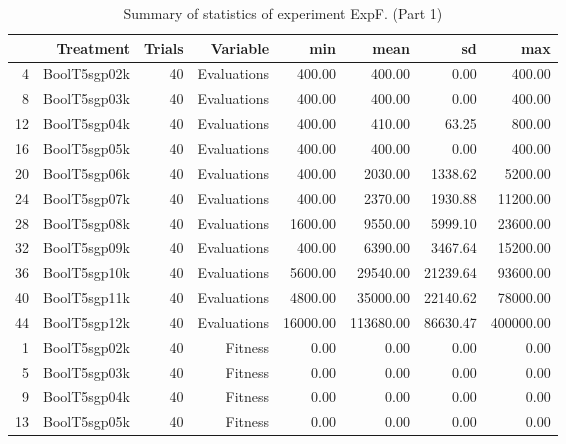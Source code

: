\begin{table}[ht]
\centering
\begin{tabular}{rrrrrrrr}
  \hline
 & Treatment & Trials & Variable & min & mean & sd & max \\ 
  \hline
4 & BoolT5sgp02k &  40 & Evaluations & 400.00 & 400.00 & 0.00 & 400.00 \\ 
  8 & BoolT5sgp03k &  40 & Evaluations & 400.00 & 400.00 & 0.00 & 400.00 \\ 
  12 & BoolT5sgp04k &  40 & Evaluations & 400.00 & 410.00 & 63.25 & 800.00 \\ 
  16 & BoolT5sgp05k &  40 & Evaluations & 400.00 & 400.00 & 0.00 & 400.00 \\ 
  20 & BoolT5sgp06k &  40 & Evaluations & 400.00 & 2030.00 & 1338.62 & 5200.00 \\ 
  24 & BoolT5sgp07k &  40 & Evaluations & 400.00 & 2370.00 & 1930.88 & 11200.00 \\ 
  28 & BoolT5sgp08k &  40 & Evaluations & 1600.00 & 9550.00 & 5999.10 & 23600.00 \\ 
  32 & BoolT5sgp09k &  40 & Evaluations & 400.00 & 6390.00 & 3467.64 & 15200.00 \\ 
  36 & BoolT5sgp10k &  40 & Evaluations & 5600.00 & 29540.00 & 21239.64 & 93600.00 \\ 
  40 & BoolT5sgp11k &  40 & Evaluations & 4800.00 & 35000.00 & 22140.62 & 78000.00 \\ 
  44 & BoolT5sgp12k &  40 & Evaluations & 16000.00 & 113680.00 & 86630.47 & 400000.00 \\ 
  1 & BoolT5sgp02k &  40 & Fitness & 0.00 & 0.00 & 0.00 & 0.00 \\ 
  5 & BoolT5sgp03k &  40 & Fitness & 0.00 & 0.00 & 0.00 & 0.00 \\ 
  9 & BoolT5sgp04k &  40 & Fitness & 0.00 & 0.00 & 0.00 & 0.00 \\ 
  13 & BoolT5sgp05k &  40 & Fitness & 0.00 & 0.00 & 0.00 & 0.00 \\ 
   \hline
\end{tabular}
\caption{Summary of statistics of experiment ExpF. (Part 1)} 
\end{table}
